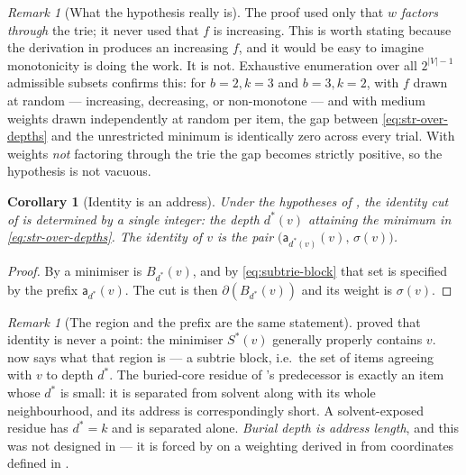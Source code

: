 \documentclass[11pt,twocolumn,a4paper]{article}
\theoremstyle{thmstyle}
\newtheorem{corollary}[theorem]{Corollary}
\theoremstyle{definition}
\theoremstyle{remark}
\newtheorem{remark}[theorem]{Remark}
\newcommand{\V}{V}
\newcommand{\wt}{w}
\newcommand{\cut}{\partial}
\newcommand{\str}{\sigma}
\newcommand{\addr}{\mathsf{a}}
\newcommand{\abs}[1]{\lvert#1\rvert}
\begin{document}
\begin{remark}[What the hypothesis really is]
\label{rem:factoring-not-monotone}
The proof used only that $\wt$ \emph{factors through} the trie; it
never used that $f$ is increasing. This is worth stating because the
derivation in  produces an increasing $f$, and it
would be easy to imagine monotonicity is doing the work. It is not.
Exhaustive enumeration over all $2^{\abs{\V}-1}$ admissible subsets
confirms this: for $b=2,k=3$ and $b=3,k=2$, with $f$ drawn at random
--- increasing, decreasing, or non-monotone --- and with medium weights
drawn independently at random per item, the gap between
\eqref{eq:str-over-depths} and the unrestricted minimum is
identically zero across every trial. With weights \emph{not} factoring
through the trie the gap becomes strictly positive, so the hypothesis
is not vacuous.
\end{remark}

\begin{corollary}[Identity is an address]
\label{cor:identity-is-address}
Under the hypotheses of , the identity cut of
 is determined by a single integer: the depth
$d^{*}(v)$ attaining the minimum in \eqref{eq:str-over-depths}. The
identity of $v$ is the pair $\bigl(\addr_{d^{*}(v)}(v),\, \str(v)\bigr)$.
\end{corollary}

\begin{proof}
By  a minimiser is $B_{d^{*}}(v)$, and by
\eqref{eq:subtrie-block} that set is specified by the prefix
$\addr_{d^{*}}(v)$. The cut is then $\cut(B_{d^{*}}(v))$ and its weight
is $\str(v)$.
\end{proof}

\begin{remark}[The region and the prefix are the same statement]
\label{rem:region-prefix}
 proved that identity is never a point: the minimiser
$S^{*}(v)$ generally properly contains $v$. 
now says what that region is --- a subtrie block, i.e.\ the set of items
agreeing with $v$ to depth $d^{*}$. The buried-core residue of
's predecessor is exactly an item whose
$d^{*}$ is small: it is separated from solvent along with its whole
neighbourhood, and its address is correspondingly short. A solvent-exposed
residue has $d^{*} = k$ and is separated alone. \emph{Burial depth is
address length}, and this was not designed in --- it is forced by
 on a weighting derived in
 from coordinates defined in
.
\end{remark}
\end{document}
